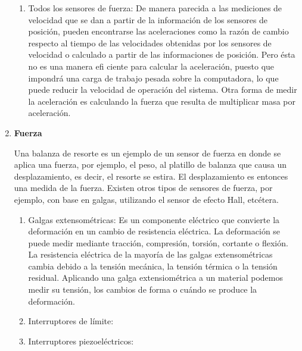 \begin{enumerate}
			\begin{enumerate}
				\item Todos los sensores de fuerza: De manera parecida a las mediciones de velocidad que se dan a partir de la información de los sensores de posición, pueden encontrarse las aceleraciones como la razón de cambio respecto al tiempo de las velocidades obtenidas por los sensores de velocidad o calculado a partir de las informaciones de posición. Pero ésta no es una manera efi ciente para calcular la aceleración, puesto que impondrá una carga de trabajo pesada sobre la computadora, lo que puede reducir la velocidad de operación del sistema. Otra forma de medir la aceleración es calculando la fuerza que resulta de multiplicar masa por aceleración. \cite{saha2010robotics}\\
			\end{enumerate}
				\begin{figure}[h]
				\centering
				\hfill
			\end{figure}
			
			\item \textbf{Fuerza}
			
			Una balanza de resorte es un ejemplo de un sensor de
			fuerza en donde se aplica una fuerza, por ejemplo, el peso, al platillo de balanza que causa un desplazamiento, es decir, el resorte se estira. El desplazamiento es entonces una medida de la fuerza. Existen otros tipos de sensores de fuerza, por ejemplo, con base en galgas, utilizando el sensor de efecto Hall, etcétera. \cite{saha2010robotics}\\
			\begin{enumerate}
				\item Galgas extensométricas: Es un componente eléctrico que convierte la deformación en un cambio de resistencia eléctrica. La deformación se puede medir mediante tracción, compresión, torsión, cortante o flexión. La resistencia eléctrica de la mayoría de las galgas extensométricas cambia debido a la tensión mecánica, la tensión térmica o la tensión residual. Aplicando una galga extensiométrica a un material podemos medir su tensión, los cambios de forma o cuándo se produce la deformación. \cite{Galgas}\\
				
				\item Interruptores de límite:
				
				\item Interruptores piezoeléctricos:
				
			\end{enumerate}
		\end{enumerate}
		

